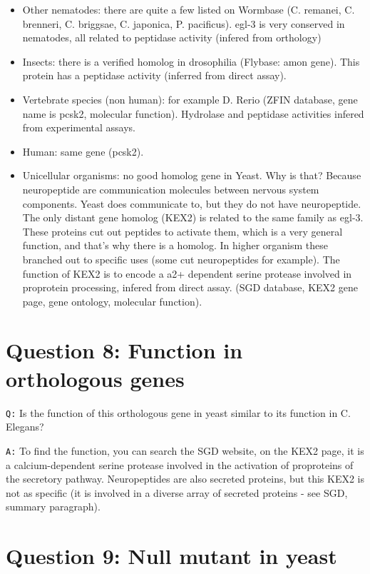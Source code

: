 \documentclass[11pt, a4paper,titlepage]{article}
\begin{document}
\begin{itemize}
\itemsep0em 
\item Other nematodes: there are quite a few listed on Wormbase
  (C. remanei, C. brenneri, C. briggsae, C. japonica,
  P. pacificus). egl-3 is very conserved in nematodes, all related to
  peptidase activity (infered from orthology)
\item Insects: there is a verified homolog in drosophilia (Flybase:
  amon gene). This protein has a peptidase activity (inferred from
  direct assay).
\item Vertebrate species (non human): for example D. Rerio (ZFIN
  database, gene name is pcsk2, molecular function). Hydrolase and
  peptidase activities infered from experimental assays.
\item Human: same gene (pcsk2).
\item Unicellular organisms: no good homolog gene in Yeast. Why is
  that? Because neuropeptide are communication molecules between
  nervous system components. Yeast does communicate to, but they do
  not have neuropeptide. The only distant gene homolog (KEX2) is
  related to the same family as egl-3. These proteins cut out peptides
  to activate them, which is a very general function, and that's why
  there is a homolog. In higher organism these branched out to
  specific uses (some cut neuropeptides for example). The function of
  KEX2 is to encode a a2+ dependent serine protease involved in
  proprotein processing, infered from direct assay. (SGD database,
  KEX2 gene page, gene ontology, molecular function).
\end{itemize}

\section*{Question 8: Function in orthologous genes}

\texttt{Q:} Is the function of this orthologous gene in yeast similar
to its function in C. Elegans?
\smallskip

\noindent\texttt{A:} To find the function, you can search the SGD
website, on the KEX2 page, it is a calcium-dependent serine protease
involved in the activation of proproteins of the secretory
pathway. Neuropeptides are also secreted proteins, but this KEX2 is
not as specific (it is involved in a diverse array of secreted
proteins - see SGD, summary paragraph).

\section*{Question 9: Null mutant in yeast}
\end{document}
